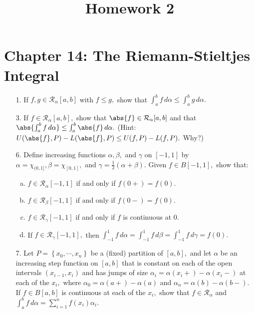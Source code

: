 \documentclass{article}
\begin{document}
\title{Homework 2}
\maketitle
\thispagestyle{fancy}

\section*{Chapter 14: The Riemann-Stieltjes Integral}

\begin{itemize}
	\item[1.] If $f, g\in \mathcal R_\alpha[a, b]$ with $f\le g,$ show that $\int_a^b f\, d\alpha \le \int_a^b g\, d\alpha.$

	\item[3.] If $f\in\mathcal R_\alpha[a, b],$ show that $\abs{f}\in \mathcal R_\alpha[a, b]$ and that $\abs{\int_a^b f\, d\alpha}\le\int_a^b\abs{f}\, d\alpha.$ (Hint: $U(\abs{f}, P)-L(\abs{f}, P)\le U(f, P)-L(f, P).$ Why?)

	\item[6.] Define increasing functions $\alpha, \beta,$ and $\gamma$ on $[-1, 1]$ by $\alpha=\chi_{(0, 1]}, \beta=\chi_{[0, 1]},$ and $\gamma=\frac{1}{2}(\alpha+\beta).$ Given $f\in B[-1, 1],$ show that:
		\begin{enumerate}[(a)]
			\item $f\in\mathcal R_\alpha[-1, 1]$ if and only if $f(0+)=f(0).$

			\item $f\in\mathcal R_\beta[-1, 1]$ if and only if $f(0-)=f(0).$

			\item $f\in\mathcal R_\gamma[-1, 1]$ if and only if $f$ is continuous at 0.

			\item If $f\in\mathcal R_\gamma[-1, 1],$ then $\int_{-1}^1 f\, d\alpha=\int_{-1}^1 f\, d\beta = \int_{-1}^1 f\, d\gamma = f(0).$
				
		\end{enumerate}

	\item[7.] Let $P=\left\{ x_0, \cdots, x_n \right\}$ be a (fixed) partition of $[a, b],$ and let $\alpha$ be an increasing step function on $[a, b]$ that is constant on each of the open intervals $(x_{i-1}, x_i)$ and has jumps of size $\alpha_i=\alpha(x_i+)-\alpha(x_i-)$ at each of the $x_i,$ where $\alpha_0=\alpha(a+)-\alpha(a)$ and $\alpha_n=\alpha(b)-\alpha(b-).$ If $f\in B[a, b]$ is continuous at each of the $x_i,$ show that $f\in\mathcal R_\alpha$ and $\int_a^b f\, d\alpha=\sum_{i=1}^{n} f(x_i)\alpha_i.$


\end{itemize}
\end{document}
